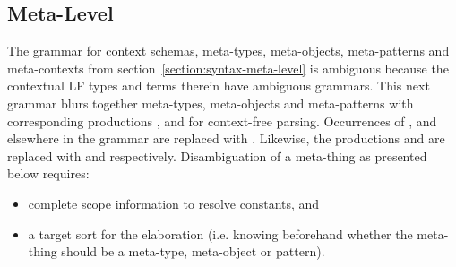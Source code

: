 \documentclass[11pt]{article}
\newcommand{\LF}{\textsc{LF}\xspace}
\begin{document}
\subsection{Meta-Level}

The grammar for context schemas, meta-types, meta-objects, meta-patterns and meta-contexts from section~\ref{section:syntax-meta-level} is ambiguous because the contextual \LF types and terms therein have ambiguous grammars.
This next grammar blurs together meta-types, meta-objects and meta-patterns with corresponding productions ,  and  for context-free parsing.
Occurrences of ,  and  elsewhere in the grammar are replaced with .
Likewise, the productions  and  are replaced with  and  respectively.
Disambiguation of a meta-thing as presented below requires:
\begin{itemize}
\item complete scope information to resolve constants, and
\item a target sort for the elaboration (i.e. knowing beforehand whether the meta-thing should be a meta-type, meta-object or pattern).
\end{itemize}
\end{document}

